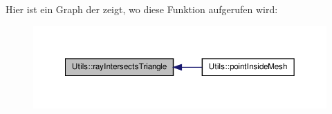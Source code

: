 Hier ist ein Graph der zeigt, wo diese Funktion aufgerufen wird\-:
\nopagebreak
\begin{figure}[H]
\begin{center}
\leavevmode
\includegraphics[width=350pt]{namespaceUtils_a5f216cc7011a901130db81321b565334_icgraph}
\end{center}
\end{figure}


